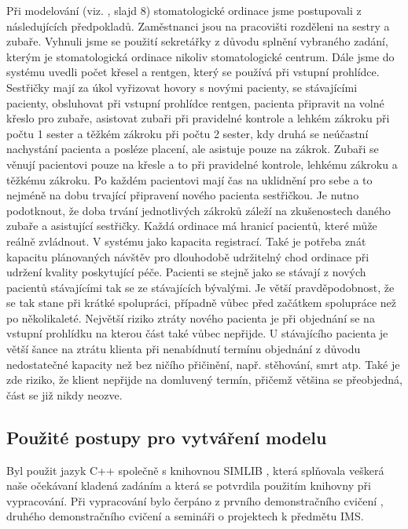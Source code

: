 \documentclass[a4paper,11pt,titlepage]{article}
\begin{document}
Při modelování (viz. \cite{ims}, slajd 8) stomatologické ordinace jsme postupovali z následujících předpokladů. Zaměstnanci jsou na pracovišti rozděleni na sestry a zubaře. Vyhnuli jsme se použití sekretářky z důvodu splnění vybraného zadání, kterým je stomatologická ordinace nikoliv stomatologické centrum. Dále jsme do systému uvedli počet křesel a rentgen, který se používá při vstupní prohlídce.
\newline
Sestřičky mají za úkol vyřizovat hovory s novými pacienty, se stávajícími pacienty, obsluhovat při vstupní prohlídce rentgen, pacienta připravit na volné křeslo pro zubaře, asistovat zubaři při pravidelné kontrole a lehkém zákroku při počtu 1 sester a těžkém zákroku při počtu 2 sester, kdy druhá se neúčastní nachystání pacienta a posléze placení, ale asistuje pouze na zákrok.
\newline
Zubaři se věnují pacientovi pouze na křesle a to při pravidelné kontrole, lehkému zákroku a těžkému zákroku. Po každém pacientovi mají čas na uklidnění pro sebe a to nejméně na dobu trvající připravení nového pacienta sestřičkou. Je nutno podotknout, že doba trvání jednotlivých zákroků záleží na zkušenostech daného zubaře a asistující sestřičky.
\newline
Každá ordinace má hranicí pacientů, které může reálně zvládnout. V systému jako kapacita registrací. Také je potřeba znát kapacitu plánovaných návštěv pro dlouhodobě udržitelný chod ordinace při udržení kvality poskytující péče.
\newline
Pacienti se stejně jako se stávají z nových pacientů stávajícími tak se ze stávajících bývalými. Je větší pravděpodobnost, že se tak stane při krátké spolupráci, případně vůbec před začátkem spolupráce než po několikaleté. 
\newline
Největší riziko ztráty nového pacienta je při objednání se na vstupní prohlídku na kterou část také vůbec nepřijde. 
\newline
U stávajícího pacienta je větší šance na ztrátu klienta při nenabídnutí termínu objednání z důvodu nedostatečné kapacity než bez ničího přičinění, např. stěhování, smrt atp. Také je zde riziko, že klient nepřijde na domluvený termín, přičemž většina se přeobjedná, část se již nikdy neozve.

\subsection{Použité postupy pro vytváření modelu}

Byl použit jazyk C++ společně s knihovnou SIMLIB \cite{simlib}, která splňovala veškerá naše očekávaní kladená zadáním a která se potvrdila použitím knihovny při vypracování. Při vypracování bylo čerpáno z prvního demonstračního cvičení \cite{dem01}, druhého demonstračního cvičení\cite{dem02} a semináři o projektech \cite{seminar} k předmětu IMS.
\end{document}
